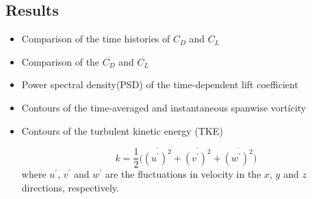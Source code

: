 \documentclass[preprint, letterpaper, nobibnotes, aps, superscriptaddress,prb]{revtex4-1}
\begin{document}
\subsection{Results}
\begin{itemize}

	\item Comparison of the time histories of $C_D$ and $C_L$
	
\begin{figure}[H]
  \centering {}
  \caption{}\label{fig22}
\end{figure}

	\item Comparison of the $\overline{C_D}$ and $\overline{C_L}$
\begin{figure}[H]
  \centering {}
  \caption{}\label{fig2}
\end{figure}
	\item Power spectral density(PSD) of the time-dependent lift coefficient
\begin{figure}[H]
  \centering {}
  \caption{}\label{fig3}
\end{figure}
\begin{figure}[H]
  \centering {}
  \caption{}\label{fig4}
\end{figure}
	\item Contours of the time-averaged and instantaneous spanwise vorticity
\begin{figure}[H]
  \centering {}
  \caption{}\label{fig5}
\end{figure}
\begin{figure}[H]
  \centering {}
  \caption{}\label{fig6}
\end{figure}
	\item Contours of the turbulent kinetic energy (TKE)
\begin{figure}[H]
  \centering {}
  \caption{}\label{fig10}
\end{figure}
\begin{equation*}
k=\frac{1}{2}\big(\overline{(u^{\prime})^2}+\overline{(v^{\prime})^2}+\overline{(w^{\prime})^2})
\end{equation*}
	where $u^{\prime}$, $v^{\prime}$ and $w^{\prime}$ are the fluctuations in velocity in the $x$, $y$ and $z$ directions, respectively.

\end{itemize}
\end{document}
